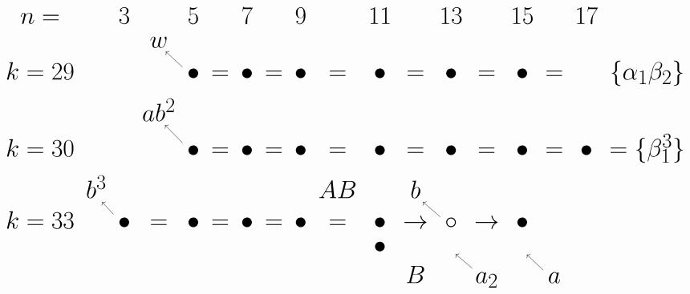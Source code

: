 \documentclass{article}
\begin{document}
\(
\begin{tikzcd}[nodes={font=\Huge},row sep=0.2cm,column sep=0.1cm]
n= & & 3 & & 5 & & 7 & & 9 & & 11 & & 13 & & 15 & & 17 &  \\
 & & & w \\
k=29 & & & & \bullet \arrow[lu] & = & \bullet & = & \bullet & = & \bullet & = & \bullet & = & \bullet & = & & \{\alpha_1\beta_2\} \\
& & & ab^2 & & & & & & \\
k=30 & & & & \bullet \arrow[lu] & = & \bullet & = & \bullet & = & \bullet & = & \bullet & = & \bullet & = & \bullet & = \{\beta_1^3\} \\
& b^3 & & & & & & & & AB & & b \\
k=33 & & \bullet \arrow[lu] & = & \bullet & = & \bullet & = & \bullet & = & \bullet & \rightarrow & \circ \arrow[lu] & \rightarrow & \bullet \\
 & & & & & & & & & & \bullet & & {} & & {} &  \\
 & & & & & & & & & & & B & & a_2 \arrow[lu] & & a \arrow[lu]
\end{tikzcd}
\)
\end{document}
